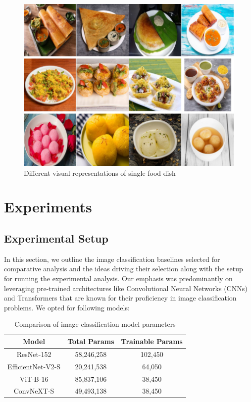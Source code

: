 \documentclass{article}
\begin{document}
\begin{figure}[h]
	\centering
	\includegraphics[width=0.75\linewidth]{figs/varied_images.pdf}
	\caption{Different visual representations of single food dish}
	\label{fig:varied-representations}
\end{figure}

\section{Experiments}
\label{sec:experi}

\subsection{Experimental Setup}
\label{subsec:experi-setup}

In this section, we outline the image classification baselines selected for comparative analysis and the ideas driving their selection along with the setup for running the experimental analysis. Our emphasis was predominantly on leveraging pre-trained architectures like Convolutional Neural Networks (CNNs) and Transformers that are known for their proficiency in image classification problems. We opted for following models: 

\begin{table}
  \centering
  \renewcommand{\arraystretch}{1.25}
  \begin{tabular}{ccc}
    \hline
    \textbf{Model} & \textbf{Total Params} & \textbf{Trainable Params} \\
    \hline
    ResNet-152 & 58,246,258 & 102,450 \\
    EfficientNet-V2-S & 20,241,538 & 64,050 \\
    ViT-B-16 & 85,837,106 & 38,450 \\\hline
    ConvNeXT-S & 49,493,138 & 38,450 \\\hline
  \end{tabular}
  \caption{Comparison of image classification model parameters}
  \label{tab:comparison-params}
\end{table}
\end{document}
